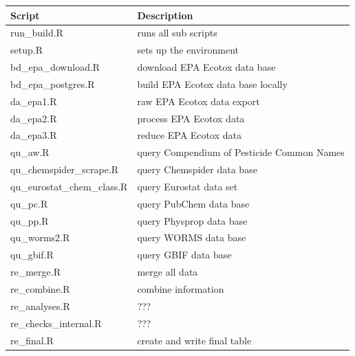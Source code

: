 \documentclass[english]{article}
\begin{document}
\begin{table}[h!]
\begin{tabular}{|l|l|}
\hline
Script                      & Description                                      \\ \hline
run\_build.R                 & runs all sub scripts                             \\ \hline
setup.R                     & sets up the environment                          \\ \hline
bd\_epa\_download.R         & download EPA Ecotox data base                    \\ \hline
bd\_epa\_postgres.R         & build EPA Ecotox data base locally               \\ \hline
da\_epa1.R                  & raw EPA Ecotox data export                       \\ \hline
da\_epa2.R                  & process EPA Ecotox data                          \\ \hline
da\_epa3.R                  & reduce EPA Ecotox data                           \\ \hline
qu\_aw.R                    & query Compendium of Pesticide Common Names       \\ \hline
qu\_chemspider\_scrape.R    & query Chemspider data base                       \\ \hline
qu\_eurostat\_chem\_class.R & query Eurostat data set                          \\ \hline
qu\_pc.R                    & query PubChem data base                          \\ \hline
qu\_pp.R                    & query Physprop data base                         \\ \hline
qu\_worms2.R                & query WORMS data base                            \\ \hline
qu\_gbif.R                  & query GBIF data base                             \\ \hline
re\_merge.R                 & merge all data                                   \\ \hline
re\_combine.R               & combine information                              \\ \hline
re\_analyses.R              & ???                                              \\ \hline
re\_checks\_internal.R      & ???                                              \\ \hline
re\_final.R                 & create and write final table                     \\ \hline

\end{tabular}
\end{table}
\end{document}
